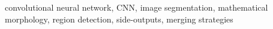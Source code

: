 \documentclass[conference]{IEEEtran}
\begin{document}
\begin{IEEEkeywords}
convolutional neural network, CNN, image segmentation, mathematical morphology, region detection, side-outputs, merging strategies
\end{IEEEkeywords}


%




%





\balance


\end{document}

